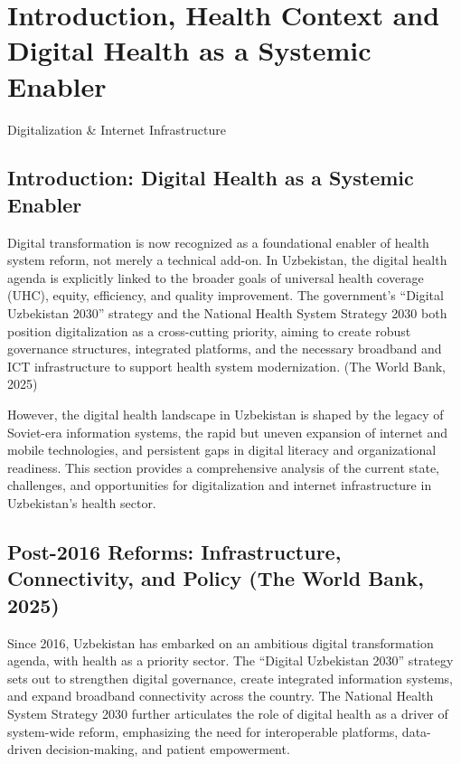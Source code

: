\chapter{Introduction, Health Context and Digital Health as a Systemic Enabler}

Digitalization \& Internet Infrastructure

\section{Introduction: Digital Health as a Systemic Enabler}\label{introduction-digital-health-as-a-systemic-enabler}

Digital transformation is now recognized as a foundational enabler of
health system reform, not merely a technical add-on. In Uzbekistan, the
digital health agenda is explicitly linked to the broader goals of
universal health coverage (UHC), equity, efficiency, and quality
improvement. The government's ``Digital Uzbekistan 2030'' strategy and
the National Health System Strategy 2030 both position digitalization as
a cross-cutting priority, aiming to create robust governance structures,
integrated platforms, and the necessary broadband and ICT infrastructure
to support health system modernization. (The World Bank, 2025)

However, the digital health landscape in Uzbekistan is shaped by the
legacy of Soviet-era information systems, the rapid but uneven expansion
of internet and mobile technologies, and persistent gaps in digital
literacy and organizational readiness. This section provides a
comprehensive analysis of the current state, challenges, and
opportunities for digitalization and internet infrastructure in
Uzbekistan's health sector.

\section[Post-2016 Reforms: Infrastructure, Connectivity, and Policy]{Post-2016 Reforms: Infrastructure, Connectivity, and Policy (The World Bank, 2025)}\label{post-2016-reforms-infrastructure-connectivity-and-policy-the-world-bank-2025}

Since 2016, Uzbekistan has embarked on an ambitious digital
transformation agenda, with health as a priority sector. The ``Digital
Uzbekistan 2030'' strategy sets out to strengthen digital governance,
create integrated information systems, and expand broadband connectivity
across the country. The National Health System Strategy 2030 further
articulates the role of digital health as a driver of system-wide
reform, emphasizing the need for interoperable platforms, data-driven
decision-making, and patient empowerment.

